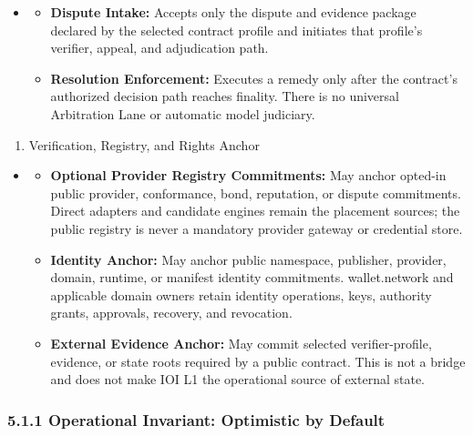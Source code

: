 \documentclass[
  11pt,
]{article}
\providecommand{\tightlist}{%
  \setlength{\itemsep}{0pt}\setlength{\parskip}{0pt}}
\begin{document}
\begin{itemize}
\item
  \begin{itemize}
  \tightlist
  \item
    \textbf{Dispute Intake:} Accepts only the dispute and evidence package
    declared by the selected contract profile and initiates that profile's
    verifier, appeal, and adjudication path.
  \item
    \textbf{Resolution Enforcement:} Executes a remedy only after the
    contract's authorized decision path reaches finality. There is no
    universal Arbitration Lane or automatic model judiciary.
  \end{itemize}
\end{itemize}

\begin{enumerate}
\def\labelenumi{\arabic{enumi}.}
\tightlist
\item
  Verification, Registry, and Rights Anchor
\end{enumerate}

\begin{itemize}
\item
  \begin{itemize}
  \tightlist
  \item
    \textbf{Optional Provider Registry Commitments:} May anchor opted-in
    public provider, conformance, bond, reputation, or dispute commitments.
    Direct adapters and candidate engines remain the placement sources; the
    public registry is never a mandatory provider gateway or credential
    store.
  \item
    \textbf{Identity Anchor:} May anchor public namespace, publisher,
    provider, domain, runtime, or manifest identity commitments.
    wallet.network and applicable domain owners retain identity operations,
    keys, authority grants, approvals, recovery, and revocation.
  \item
    \textbf{External Evidence Anchor:} May commit selected verifier-profile,
    evidence, or state roots required by a public contract. This is not a
    bridge and does not make IOI L1 the operational source of external state.
  \end{itemize}
\end{itemize}

\hypertarget{operational-invariant-optimistic-by-default}{%
\subsubsection{5.1.1 Operational Invariant: Optimistic by
Default}\label{operational-invariant-optimistic-by-default}}
\end{document}
